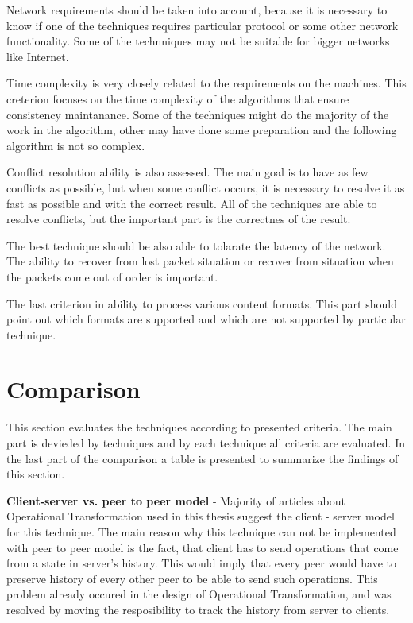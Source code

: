 \documentclass[12pt,oneside]{fithesis2}
\begin{document}
\par Network requirements should be taken into account, because it is necessary to know if one of the techniques requires particular protocol or some other network functionality. Some of the technniques may not be suitable for bigger networks like Internet.
\par Time complexity is very closely related to the requirements on the machines. This creterion focuses on the time complexity of the algorithms that ensure consistency maintanance. Some of the techniques might do the majority of the work in the algorithm, other may have done some preparation and the following algorithm is not so complex.
\par Conflict resolution ability is also assessed. The main goal is to have as few conflicts as possible, but when some conflict occurs, it is necessary to resolve it as fast as possible and with the correct result. All of the techniques are able to resolve conflicts, but the important part is the correctnes of the result. 
\par The best technique should be also able to tolarate the latency of the network. The ability to recover from lost packet situation or recover from situation when the packets come out of order is important. 
\par The last criterion in ability to process various content formats. This part should point out which formats are supported and which are not supported by particular technique.
\section{Comparison}
\par This section evaluates the techniques according to presented criteria. The main part is devieded by techniques and by each technique all criteria are evaluated. In the last part of the comparison a table  is presented to summarize the findings of this section.
\\
\par \textbf{\underline{}}

\vspace{3mm}

\textbf{Client-server vs. peer to peer model} - Majority of articles about Operational Transformation used in this thesis suggest the client - server model for this technique. The main reason why this technique can not be implemented with peer to peer model is the fact, that client has to send operations that come from a state in server's history. This would imply that every peer would have to preserve history of every other peer to be able to send such operations. This problem already occured in the design of Operational Transformation, and was resolved by moving the resposibility to track the history from server to clients.
\end{document}
